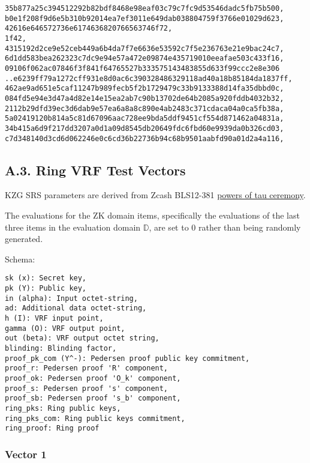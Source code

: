 \documentclass[
]{article}
\begin{document}
\begin{verbatim}
35b877a25c394512292b82bdf8468e98eaf03c79c7fc9d53546dadc5fb75b500,
b0e1f208f9d6e5b310b92014ea7ef3011e649dab038804759f3766e01029d623,
42616e646572736e6174636820766563746f72,
1f42,
4315192d2ce9e52ceb449a6b4da7f7e6636e53592c7f5e236763e21e9bac24c7,
6d1dd583bea262323c7dc9e94e57a472e09874e435719010eeafae503c433f16,
09106f062ac07846f3f841f64765527b333575143483855d633f99ccc2e8e306
..e6239ff79a1272cff931e8d0ac6c390328486329118ad40a18b85184da1837ff,
462ae9ad651e5caf11247b989fecb5f2b1729479c33b9133388d14fa35dbbd0c,
084fd5e94e3d47a4d82e14e15ea2ab7c90b13702de64b2085a920fddb4032b32,
2112b29dfd39ec3d6dab9e57ea6a8a8c890e4ab2483c371cdaca04a0ca5fb38a,
5a02419120b814a5c81d67096aac728ee9bda5ddf9451cf554d871462a04831a,
34b415a6d9f217dd3207a0d1a09d8545db20649fdc6fbd60e9939da0b326cd03,
c7d348140d3cd6d062246e0c6cd36b22736b94c68b9501aabfd90a01d2a4a116,
\end{verbatim}

\hypertarget{a.3.-ring-vrf-test-vectors}{%
\subsection{A.3. Ring VRF Test
Vectors}\label{a.3.-ring-vrf-test-vectors}}

KZG SRS parameters are derived from Zcash BLS12-381
\href{https://zfnd.org/conclusion-of-the-powers-of-tau-ceremony}{powers
of tau ceremony}.

The evaluations for the ZK domain items, specifically the evaluations of
the last three items in the evaluation domain \(\mathbb{D}\), are set to
0 rather than being randomly generated.

Schema:

\begin{verbatim}
sk (x): Secret key,
pk (Y): Public key,
in (alpha): Input octet-string,
ad: Additional data octet-string,
h (I): VRF input point,
gamma (O): VRF output point,
out (beta): VRF output octet string,
blinding: Blinding factor,
proof_pk_com (Y^-): Pedersen proof public key commitment,
proof_r: Pedersen proof 'R' component,
proof_ok: Pedersen proof 'O_k' component,
proof_s: Pedersen proof 's' component,
proof_sb: Pedersen proof 's_b' component,
ring_pks: Ring public keys,
ring_pks_com: Ring public keys commitment,
ring_proof: Ring proof
\end{verbatim}

\hypertarget{vector-1-2}{%
\subsubsection{Vector 1}\label{vector-1-2}}
\end{document}
